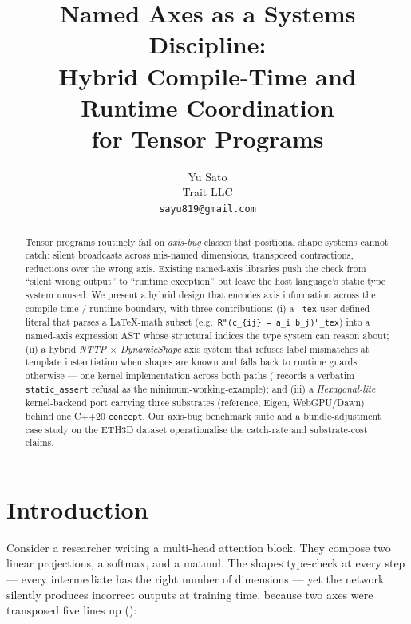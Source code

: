 \documentclass[10pt,twocolumn]{article}
\title{Named Axes as a Systems Discipline:\\
       Hybrid Compile-Time and Runtime Coordination\\
       for Tensor Programs}
\author{%
  Yu Sato\\
  Trait LLC\\
  \texttt{sayu819@gmail.com}
}
\date{}
\newcommand{\udltex}{\code{\_tex}}                            %
\newcommand{\code}[1]{\texttt{#1}}
\begin{document}
\maketitle

\begin{abstract}
Tensor programs routinely fail on \emph{axis-bug} classes that
positional shape systems cannot catch: silent broadcasts across
mis-named dimensions, transposed contractions, reductions over the
wrong axis. Existing named-axis libraries push the check from
``silent wrong output'' to ``runtime exception'' but leave the host
language's static type system unused. We present a hybrid design that
encodes axis information across the compile-time / runtime boundary,
with three contributions: (i) a \udltex{} user-defined literal that
parses a LaTeX-math subset (e.g.\
\code{R"(c\_\{ij\} = a\_i b\_j)"\_tex}) into a named-axis expression
AST whose structural indices the type system can reason about; (ii) a
hybrid \emph{NTTP $\times$ DynamicShape} axis system that refuses
label mismatches at template instantiation when shapes are known and
falls back to runtime guards otherwise --- one kernel implementation
across both paths (\Cref{app:static-catch-demo} records a verbatim
\code{static\_assert} refusal as the minimum-working-example); and
(iii) a \emph{Hexagonal-lite} kernel-backend port carrying three
substrates (reference, Eigen, WebGPU/Dawn) behind one C++20
\code{concept}. Our axis-bug benchmark suite and a bundle-adjustment
case study on the ETH3D dataset operationalise the catch-rate and
substrate-cost claims.
\end{abstract}

\section{Introduction}
\label{sec:intro}


Consider a researcher writing a multi-head attention block. They
compose two linear projections, a softmax, and a matmul. The shapes
type-check at every step --- every intermediate has the right number of
dimensions --- yet the network silently produces incorrect outputs at
training time, because two axes were transposed five lines up
():
\end{document}
